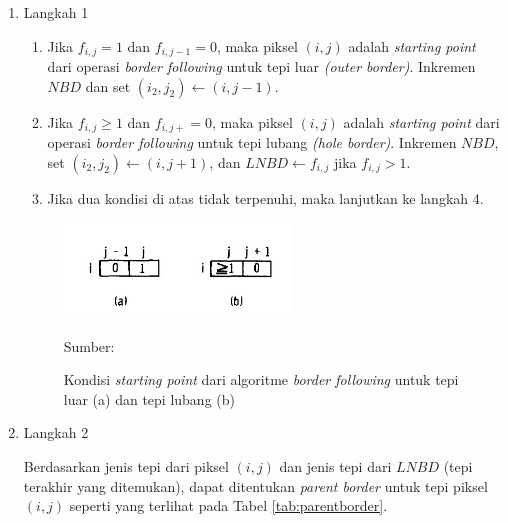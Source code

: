     \begin{enumerate}
        \item Langkah 1
        
        \begin{enumerate}[label=(\alph*)]
            \item Jika $f_{i, j} = 1$ dan $f_{i, j - 1} = 0$, maka piksel $(i, j)$ adalah \textit{starting point} dari operasi \textit{border following} untuk tepi luar \textit{(outer border)}. Inkremen $NBD$ dan set $(i_2, j_2) \leftarrow (i, j-1)$.
            \item Jika $f_{i, j} \geq 1$ dan $f_{i, j+} = 0$, maka piksel $(i, j)$ adalah \textit{starting point} dari operasi \textit{border following} untuk tepi lubang \textit{(hole border)}. Inkremen $NBD$, set $(i_2, j_2) \leftarrow (i, j + 1)$, dan $LNBD \leftarrow f_{i, j}$ jika $f_{i, j} > 1$.
            \item Jika dua kondisi di atas tidak terpenuhi, maka lanjutkan ke langkah 4.
        \end{enumerate}
        
        \vspace{-0.9cm}
        \begin{figure}[H]
        \centering
          \singlespacing
          \captionsetup{justification=centering,margin=2cm}
          \includegraphics[width=6cm]{image/outerorholeborder.jpg}
          \caption{Kondisi \textit{starting point} dari algoritme \textit{border following} untuk tepi luar (a) dan tepi lubang (b)}
          \small{Sumber: \citep{Suzuki1985}}
          \label{fig:outerandholeborder}
        \end{figure}
        
        \item Langkah 2
        
        Berdasarkan jenis tepi dari piksel $(i, j)$ dan jenis tepi dari $LNBD$ (tepi terakhir yang ditemukan), dapat ditentukan \textit{parent border} untuk tepi piksel $(i, j)$ seperti yang terlihat pada Tabel \ref{tab:parentborder}.
    

\end{enumerate}
